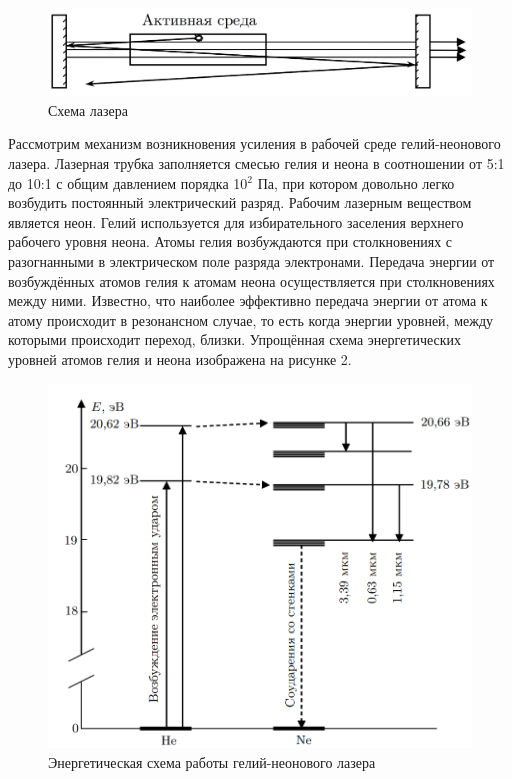 \documentclass[a4paper,12pt]{article} %
\begin{document}
	\begin{figure}[h!]
		\centering
		\includegraphics[scale=0.55]{Pictures/Схема Лазера}
		\caption{Схема лазера}
	\end{figure}

	Рассмотрим механизм возникновения усиления в рабочей среде гелий-неонового лазера. Лазерная трубка заполняется смесью гелия и неона в соотношении от 5:1 до 10:1 с общим давлением порядка 10$^2$ Па, при котором довольно легко возбудить постоянный электрический разряд. Рабочим лазерным веществом является неон. Гелий используется для избирательного заселения верхнего рабочего уровня неона. Атомы гелия возбуждаются при столкновениях с разогнанными в электрическом поле разряда электронами. Передача энергии от возбуждённых атомов гелия к атомам неона осуществляется при столкновениях между ними. Известно, что наиболее эффективно передача энергии от атома к атому происходит в резонансном случае, то есть когда энергии уровней, между которыми происходит переход, близки. Упрощённая схема энергетических уровней атомов гелия и неона изображена на рисунке 2.
	
	\begin{figure}[h!]
		\centering
		\includegraphics[scale=0.6]{Pictures/Переход}
		\caption{Энергетическая схема работы гелий-неонового лазера}
	\end{figure}
	
\end{document}
